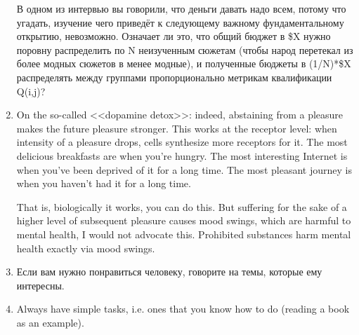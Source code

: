 \documentclass[11pt]{article}
\theoremstyle{remark}
\theoremstyle{definition}
\begin{document}
\begin{enumerate}
В одном из интервью вы говорили, что деньги давать надо всем, потому что угадать, изучение чего приведёт к следующему важному фундаментальному открытию, невозможно. Означает ли это, что общий бюджет в \$X нужно поровну распределить по N неизученным сюжетам (чтобы народ перетекал из более модных сюжетов в менее модные), и полученные бюджеты в (1/N)*\$X распределять между группами пропорционально метрикам квалификации Q(i,j)?



\item On the so-called <<dopamine detox>>: indeed, abstaining from a pleasure makes the future pleasure stronger. This works at the receptor level: when intensity of a pleasure drops, cells synthesize more receptors for it. The most delicious breakfasts are when you're hungry. The most interesting Internet is when you've been deprived of it for a long time. The most pleasant journey is when you haven't had it for a long time.

That is, biologically it works, you can do this. But suffering for the sake of a higher level of subsequent pleasure causes mood swings, which are harmful to mental health, I would not advocate this. Prohibited substances harm mental health exactly via mood swings.




\item Если вам нужно понравиться человеку, говорите на темы, которые ему интересны.




\item Always have simple tasks, i.e. ones that you know how to do (reading a book as an example).



\end{enumerate}
\end{document}
